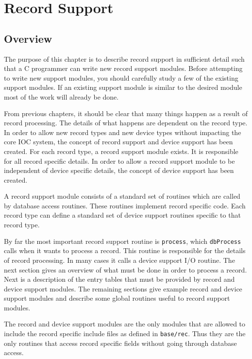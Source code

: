 \chapter{Record Support}

\section{Overview}

The purpose of this chapter is to describe record support in sufficient detail such that a C programmer can write new 
record support modules. Before attempting to write new support modules, you should carefully study a few of the existing 
support modules. If an existing support module is similar to the desired module most of the work will already be done.

From previous chapters, it should be clear that many things happen as a result of record processing. The details of what 
happens are dependent on the record type. In order to allow new record types and new device types without impacting the 
core IOC system, the concept of record support and device support has been created. For each record type, a record 
support module exists. It is responsible for all record specific details. In order to allow a record support module to be 
independent of device specific details, the concept of device support has been created.

A record support module consists of a standard set of routines which are called by database access routines. These 
routines implement record specific code. Each record type can define a standard set of device support routines specific to 
that record type.

By far the most important record support routine is \verb|process|, which \verb|dbProcess| calls when it wants to process a record. 
This routine is responsible for the details of record processing. In many cases it calls a device support I/O routine. The 
next section gives an overview of what must be done in order to process a record. Next is a description of the entry tables 
that must be provided by record and device support modules. The remaining sections give example record and device 
support modules and describe some global routines useful to record support modules.

The record and device support modules are the only modules that are allowed to include the record specific include files 
as defined in \verb|base/rec|. Thus they are the only routines that access record specific fields without going through database 
access.

